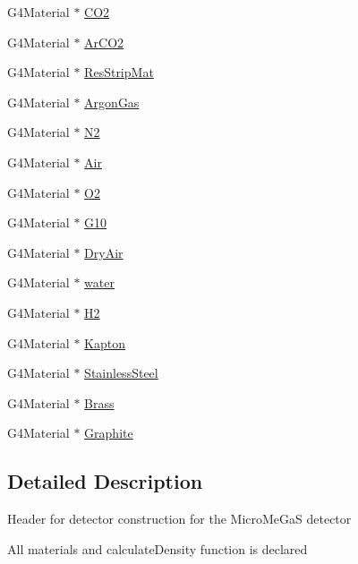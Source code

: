 \begin{DoxyCompactItemize}
G4\+Material $\ast$ \hyperlink{classUMDetectorConstruction_a714674bf7cc9b35fe3f1e08964afe06e}{C\+O2}
\item 
G4\+Material $\ast$ \hyperlink{classUMDetectorConstruction_a5add19e809d833190fdab4191336732f}{Ar\+C\+O2}
\item 
G4\+Material $\ast$ \hyperlink{classUMDetectorConstruction_a17b5a6c14de5dcdd7b416e8c52d0eff4}{Res\+Strip\+Mat}
\item 
G4\+Material $\ast$ \hyperlink{classUMDetectorConstruction_a551e6071382b21b8733f6be1e6fcdf80}{Argon\+Gas}
\item 
G4\+Material $\ast$ \hyperlink{classUMDetectorConstruction_a5d6061798465e6b2177439140dd686fa}{N2}
\item 
G4\+Material $\ast$ \hyperlink{classUMDetectorConstruction_a0b3feb2bbad467f995f5a8673e986e75}{Air}
\item 
G4\+Material $\ast$ \hyperlink{classUMDetectorConstruction_ae6d95b4ba7392362285d85b9729cf5e1}{O2}
\item 
G4\+Material $\ast$ \hyperlink{classUMDetectorConstruction_a72c233eda7089151b52fa0484a245c48}{G10}
\item 
G4\+Material $\ast$ \hyperlink{classUMDetectorConstruction_a101b19094988fca9e641d9b2dcabe451}{Dry\+Air}
\item 
G4\+Material $\ast$ \hyperlink{classUMDetectorConstruction_ac5dda74afd06dbe0374ced4f64e97fd3}{water}
\item 
G4\+Material $\ast$ \hyperlink{classUMDetectorConstruction_ada72bb1603ced0a5d0f65b32d9fbba83}{H2}
\item 
G4\+Material $\ast$ \hyperlink{classUMDetectorConstruction_ae22c73c068ba5723646b46ac0f733289}{Kapton}
\item 
G4\+Material $\ast$ \hyperlink{classUMDetectorConstruction_a6102b1f41a169fa4663c3254e2f09e28}{Stainless\+Steel}
\item 
G4\+Material $\ast$ \hyperlink{classUMDetectorConstruction_af8c8eba12f76f44ee65cb3af4ee6b77c}{Brass}
\item 
G4\+Material $\ast$ \hyperlink{classUMDetectorConstruction_a1133e7d92453ae2c5639f26d76c0c027}{Graphite}
\end{DoxyCompactItemize}


\subsection{Detailed Description}
Header for detector construction for the Micro\+Me\+Ga\+S detector \begin{DoxyVerb}All materials and \sa calculateDensity function is declared\end{DoxyVerb}
 

